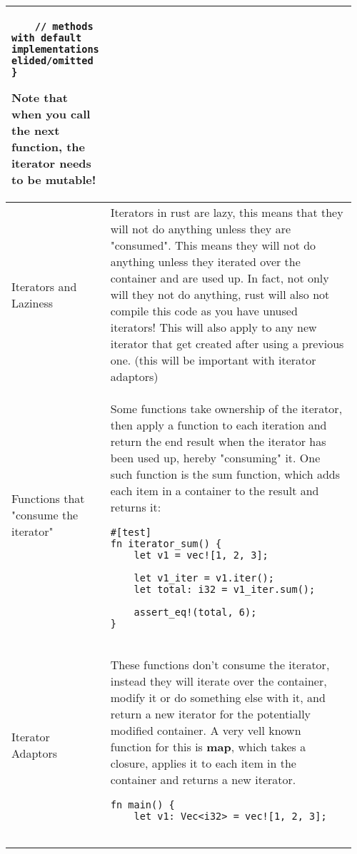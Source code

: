\documentclass[main.tex,fontsize=8pt,paper=a4,paper=portrait,DIV=calc,]{scrartcl}
\begin{document}
\begin{table}[ht!]
\begin{tabular}{|m{0.2\linewidth}|m{0.755\linewidth}|}
\begin{lstlisting}
    // methods with default implementations elided/omitted
}
\end{lstlisting} 
\textcolor{OliveGreen}{Note that when you call the next function, the iterator needs to be mutable!}\\
\hline
Iterators and Laziness & 
Iterators in rust are lazy, this means that they will not do anything unless they are "consumed". \newline
This means they will not do anything unless they iterated over the container and are used up.\newline
In fact, not only will they not do anything, rust will also not compile this code as you have unused iterators!
This will also apply to any new iterator that get created after using a previous one. (this will be important with iterator adaptors)\\
\hline
Functions that "consume the iterator" & 
Some functions take ownership of the iterator, then apply a function to each iteration and return the end result when the iterator has been used up, hereby "consuming" it.\newline
One such function is the sum function, which adds each item in a container to the result and returns it:\newline
\begin{lstlisting}
#[test]
fn iterator_sum() {
    let v1 = vec![1, 2, 3];

    let v1_iter = v1.iter();
    let total: i32 = v1_iter.sum();

    assert_eq!(total, 6);
}
\end{lstlisting}\\
\hline
Iterator Adaptors & 
These functions don't consume the iterator, instead they will iterate over the container, modify it or do something else with it, and return a new iterator for the potentially modified container.\newline
A very vell known function for this is \textbf{map}, which takes a closure, applies it to each item in the container and returns a new iterator.\newline
\begin{lstlisting}
fn main() {
    let v1: Vec<i32> = vec![1, 2, 3];


\end{lstlisting}
\end{tabular}
\end{table}
\end{document}
